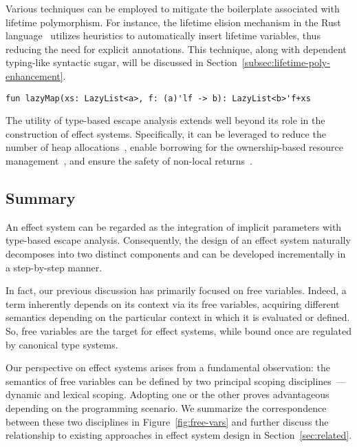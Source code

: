 \documentclass[acmsmall,review,screen]{acmart}
\begin{document}
Various techniques can be employed to mitigate the boilerplate associated with lifetime polymorphism.
For instance, the lifetime elision mechanism in the Rust language~\cite{matsakis2014rust} utilizes heuristics to automatically insert lifetime variables, thus reducing the need for explicit annotations.
This technique, along with dependent typing-like syntactic sugar, will be discussed in Section~\ref{subsec:lifetime-poly-enhancement}.
\begin{lstlisting}[language=colang]
    fun lazyMap(xs: LazyList<a>, f: (a)'lf -> b): LazyList<b>'f+xs
\end{lstlisting}

The utility of type-based escape analysis extends well beyond its role in the construction of effect systems.
Specifically, it can be leveraged to reduce the number of heap allocations~\cite{lorenzen2024oxidizing}, enable borrowing for the ownership-based resource management~\cite{matsakis2014rust, lorenzen2024oxidizing}, and ensure the safety of non-local returns~\cite{akhin2021kotlin}.

\subsection{Summary} \label{subsec:idea-summary}

An effect system can be regarded as the integration of implicit parameters with type-based escape analysis.
Consequently, the design of an effect system naturally decomposes into two distinct components and can be developed incrementally in a step-by-step manner.

In fact, our previous discussion has primarily focused on free variables.
Indeed, a term inherently depends on its context via its free variables, acquiring different semantics depending on the particular context in which it is evaluated or defined.
So, free variables are the target for effect systems, while bound once are regulated by canonical type systems.

Our perspective on effect systems arises from a fundamental observation: the semantics of free variables can be defined by two principal scoping disciplines~--- dynamic and lexical scoping.
Adopting one or the other proves advantageous depending on the programming scenario.
We summarize the correspondence between these two disciplines in Figure~\ref{fig:free-vars} and further discuss the relationship to existing approaches in effect system design in Section~\ref{sec:related}.
\end{document}
